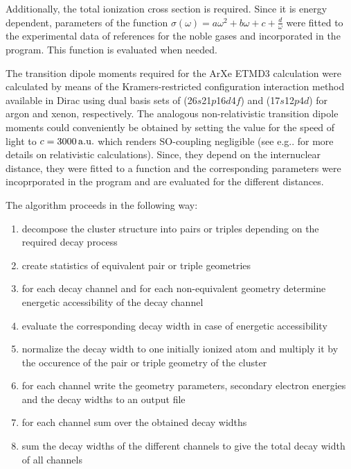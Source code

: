 Additionally, the total ionization cross section is required. Since it is
energy dependent, 
parameters of the function
$\sigma(\omega) = a\omega^2 + b\omega + c + \frac{d}{\omega}$ were fitted
to the experimental data of references \cite{West76,West78}
for the noble gases and incorporated in the program. This function is evaluated
when needed.

The transition dipole moments required for the ArXe ETMD3 calculation were
calculated by means of the Kramers-restricted configuration interaction
method \cite{Thyssen08, Fleig03, KnechtPHD} available in Dirac
using dual basis sets of (26$s$21$p$16$d$4$f$) and
(17$s$12$p$4$d$) for argon and xenon, respectively. The analogous
non-relativistic transition dipole moments could conveniently be
obtained by setting the value for the speed of light to
$c=\unit[3000]{a.u.}$ which renders SO-coupling negligible
(see e.g.. \cite{Saue11} for more details on relativistic calculations).
Since, they depend on the
internuclear distance, they were fitted to a function and the corresponding
parameters were incoprporated in the program and are evaluated for the
different distances.

The algorithm proceeds in the following way:
\begin{enumerate}
 \item decompose the cluster structure into pairs or triples depending
       on the required decay process
 \item create statistics of equivalent pair or triple geometries
 \item for each decay channel and for each non-equivalent geometry
       determine energetic accessibility of the decay channel
 \item evaluate the corresponding decay width in case of energetic accessibility
 \item normalize the decay width to one initially ionized atom and multiply
       it by the occurence of the pair or triple geometry of the cluster
 \item for each channel write the geometry parameters, secondary electron energies
       and the decay widths to an output file
 \item for each channel sum over the obtained decay widths
 \item sum the decay widths of the different channels to give the total decay
       width of all channels
\end{enumerate}

